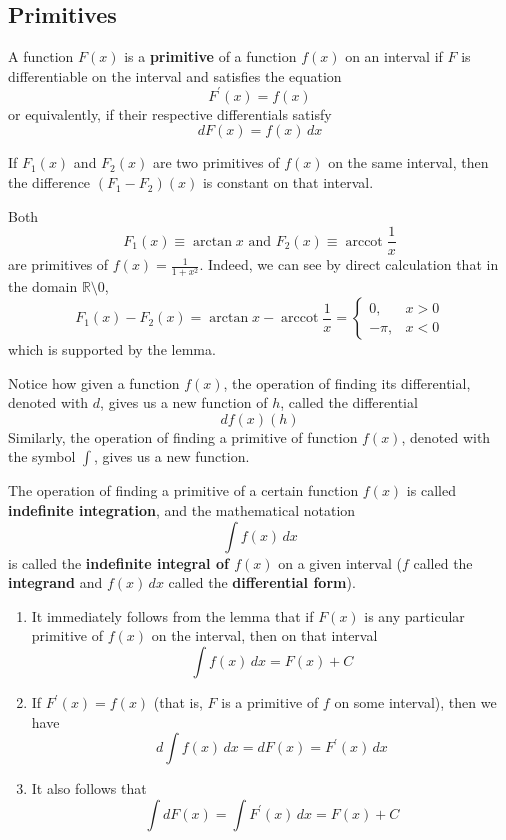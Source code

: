 \documentclass{article}
\DeclareMathOperator{\arccot}{arccot}
\begin{document}
  \subsection{Primitives}

    \begin{definition}[Primitive]
      A function $F(x)$ is a \textbf{primitive} of a function $f(x)$ on an interval if $F$ is differentiable on the interval and satisfies the equation 
      \[F^\prime (x) = f(x)\]
      or equivalently, if their respective differentials satisfy
      \[d F(x) = f(x) \,dx\]
    \end{definition}

    \begin{lemma}
      If $F_1(x)$ and $F_2 (x)$ are two primitives of $f(x)$ on the same interval, then the difference $(F_1 - F_2)(x)$ is constant on that interval. 
    \end{lemma}

  \begin{example}
  Both 
  \[F_1(x) \equiv \arctan{x} \text{ and } F_2(x) \equiv \arccot{\frac{1}{x}}\]
  are primitives of $f(x) = \frac{1}{1 + x^2}$. Indeed, we can see by direct calculation that in the domain $\mathbb{R} \setminus 0$, 
  \[F_1 (x) - F_2 (x) = \arctan{x} - \arccot{\frac{1}{x}} = \begin{cases}
  0, & x > 0 \\
  -\pi, & x < 0
  \end{cases}\]
  which is supported by the lemma. 
  \end{example}

    Notice how given a function $f(x)$, the operation of finding its differential, denoted with $d$, gives us a new function of $h$, called the differential 
    \[df(x)(h)\]
    Similarly, the operation of finding a primitive of function $f(x)$, denoted with the symbol $\int$, gives us a new function. 

    \begin{definition}
      The operation of finding a primitive of a certain function $f(x)$ is called \textbf{indefinite integration}, and the mathematical notation 
      \[\int f(x) \,dx\]
      is called the \textbf{indefinite integral of $f(x)$} on a given interval ($f$ called the \textbf{integrand} and $f(x)\,dx$ called the \textbf{differential form}). 
      \begin{enumerate}
        \item It immediately follows from the lemma that if $F(x)$ is any particular primitive of $f(x)$ on the interval, then on that interval 
        \[\int f(x) \,dx = F(x) + C\]
        \item If $F^\prime (x) = f(x)$ (that is, $F$ is a primitive of $f$ on some interval), then we have
        \[d \int f(x)\,dx = d F(x) = F^\prime (x) \,dx \]
        \item It also follows that 
        \[\int d F(x) = \int F^\prime (x)\,dx = F(x) + C\]
      \end{enumerate}
    \end{definition}
\end{document}
